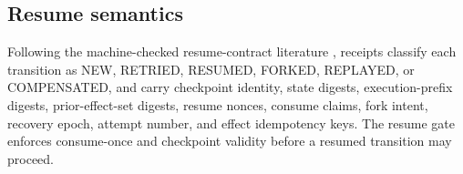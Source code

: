 \subsection{Resume semantics}

Following the machine-checked resume-contract literature
\cite{resume_contract}, receipts classify each transition as NEW, RETRIED,
RESUMED, FORKED, REPLAYED, or COMPENSATED, and carry checkpoint identity,
state digests, execution-prefix digests, prior-effect-set digests, resume
nonces, consume claims, fork intent, recovery epoch, attempt number, and
effect idempotency keys. The resume gate enforces consume-once and
checkpoint validity before a resumed transition may proceed.
